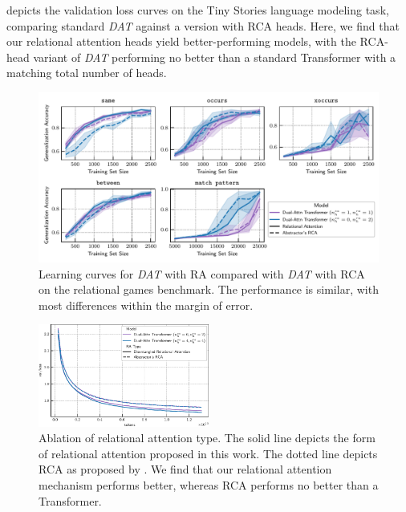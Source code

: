  depicts the validation loss curves on the Tiny Stories language modeling task, comparing standard \textit{DAT} against a version with RCA heads. Here, we find that our relational attention heads yield better-performing models, with the RCA-head variant of \textit{DAT} performing no better than a standard Transformer with a matching total number of heads.

\begin{figure}[ht]
    \includegraphics[width=\textwidth]{figs/experiments/relgames/relgames_learning_curves_rcatype_ablation.pdf}
    \caption{Learning curves for \textit{DAT} with RA compared with \textit{DAT} with RCA on the relational games benchmark. The performance is similar, with most differences within the margin of error.}\label{fig:relgames_ratype_ablation}
\end{figure}

\begin{figure}[ht]
    \centering
    \includegraphics[width=0.5\textwidth]{figs/experiments/tiny_stories/d64L4_ra_type_ablation_symattn_asymra.pdf}
    \caption{Ablation of relational attention type. The solid line depicts the form of relational attention proposed in this work. The dotted line depicts RCA as proposed by \citet{altabaa2024abstractors}. We find that our relational attention mechanism performs better, whereas RCA performs no better than a Transformer.}\label{fig:tinystories_ratype_ablation}
\end{figure}